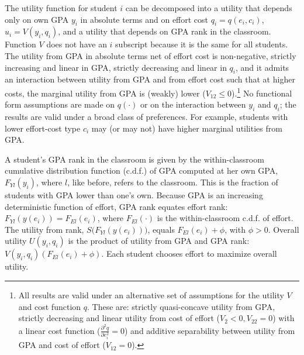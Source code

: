 The utility function for student $i$ can be decomposed into a utility that depends only on own GPA $y_i$ in absolute terms and on effort cost $q_i=q(e_i,c_i)$, $u_i=V(y_i,q_i)$, and a utility that depends on GPA rank in the classroom. Function $V$ does not have an $i$ subscript because it is the same for all students. The utility from GPA in absolute terms net of effort cost is non-negative, strictly increasing and linear in GPA, strictly decreasing and linear in $q_i$, and it admits an interaction between utility from GPA and from effort cost such that at higher costs, the marginal utility from GPA is (weakly) lower ($V_{12}\leq 0$).\footnote{All results are valid under an alternative set of assumptions for the utility $V$ and cost function $q$. These are: strictly quasi-concave utility from GPA, strictly decreasing and linear utility from cost of effort ($V_2<0,V_{22}=0$) with a linear cost function ($\frac{\partial^2 q}{\partial e_i^2 }=0$) and additive separability between utility from GPA and cost of effort ($V_{12}=0$).} No functional form assumptions are made on $q(\cdot)$ or on the interaction between $y_i$ and $q_i$; the results are valid under a broad class of preferences. For example, students with lower effort-cost type $c_i$ may (or may not) have higher marginal utilities from GPA.\par 
A student's GPA rank in the classroom is given by the within-classroom cumulative distribution function (c.d.f.) of GPA computed at her own GPA, $F_{Yl}(y_i)$, where $l$, like before, refers to the classroom. This is the fraction of students with GPA lower than one's own. Because GPA is an increasing deterministic function of effort, GPA rank equates effort rank: $F_{Yl}(y(e_i))=F_{El}(e_i)$, where $F_{El}(\cdot)$ is the within-classroom c.d.f. of effort. The utility from rank, $S\big(F_{Yl}(y(e_i))\big)$, equals $F_{El}(e_i)+\phi$, with $\phi>0$. Overall utility $U(y_i,q_i)$ is the product of utility from GPA and GPA rank: $V(y_i,q_i)\left(F_{El}(e_i)+\phi\right)$. Each student chooses effort to maximize overall utility.\par 

